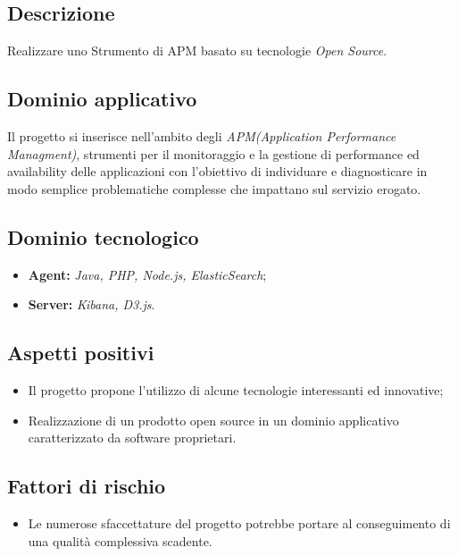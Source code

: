 \documentclass[openany,12pt,a4paper]{report}
\begin{document}
	\subsection{Descrizione}
	
	Realizzare uno Strumento di APM basato su tecnologie \textit{Open Source}.
	
	\subsection{Dominio applicativo}
	
	Il progetto si inserisce nell'ambito degli \textit{APM(Application Performance Managment)}, strumenti per il monitoraggio e la gestione di performance ed availability delle applicazioni con l’obiettivo di individuare e diagnosticare in modo semplice problematiche complesse che impattano sul servizio erogato.
	
	\subsection{Dominio tecnologico}
	
	\begin{itemize}
		\item \textbf{Agent:} \textit{Java, PHP, Node.js, ElasticSearch};
		
		\item \textbf{Server:} \textit{Kibana, D3.js}.
	\end{itemize}
	
	\subsection{Aspetti positivi}
	
	\begin{itemize}
		\item Il progetto propone l'utilizzo di alcune tecnologie interessanti ed innovative;
		
		\item Realizzazione di un prodotto open source in un dominio applicativo caratterizzato da software proprietari.
	\end{itemize}
	
	\subsection{Fattori di rischio}
	
	\begin{itemize}
		\item Le numerose sfaccettature del progetto potrebbe portare al conseguimento di una qualità complessiva scadente.
	\end{itemize}
	
\end{document}
